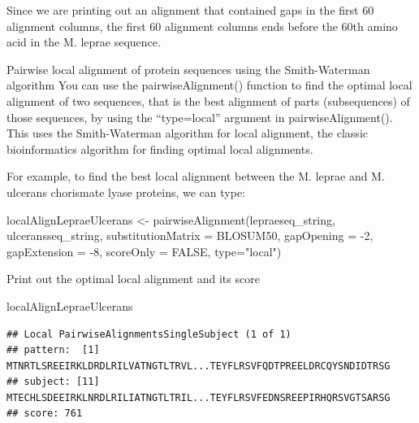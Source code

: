 \documentclass[
]{book}
\newenvironment{Shaded}{\begin{snugshade}}{\end{snugshade}}
\newcommand{\AttributeTok}[1]{\textcolor[rgb]{0.77,0.63,0.00}{#1}}
\newcommand{\ConstantTok}[1]{\textcolor[rgb]{0.00,0.00,0.00}{#1}}
\newcommand{\DecValTok}[1]{\textcolor[rgb]{0.00,0.00,0.81}{#1}}
\newcommand{\FunctionTok}[1]{\textcolor[rgb]{0.00,0.00,0.00}{#1}}
\newcommand{\NormalTok}[1]{#1}
\newcommand{\OtherTok}[1]{\textcolor[rgb]{0.56,0.35,0.01}{#1}}
\newcommand{\SpecialCharTok}[1]{\textcolor[rgb]{0.00,0.00,0.00}{#1}}
\newcommand{\StringTok}[1]{\textcolor[rgb]{0.31,0.60,0.02}{#1}}
\begin{document}
Since we are printing out an alignment that contained gaps in the first 60 alignment columns, the first 60 alignment columns ends before the 60th amino acid in the M. leprae sequence.

Pairwise local alignment of protein sequences using the Smith-Waterman algorithm
You can use the pairwiseAlignment() function to find the optimal local alignment of two sequences, that is the best alignment of parts (subsequences) of those sequences, by using the ``type=local'' argument in pairwiseAlignment(). This uses the Smith-Waterman algorithm for local alignment, the classic bioinformatics algorithm for finding optimal local alignments.

For example, to find the best local alignment between the M. leprae and M. ulcerans chorismate lyase proteins, we can type:

\begin{Shaded}
\begin{Highlighting}[]
\NormalTok{localAlignLepraeUlcerans }\OtherTok{\textless{}{-}} \FunctionTok{pairwiseAlignment}\NormalTok{(lepraeseq\_string, }
\NormalTok{                                              ulceransseq\_string,}
                                              \AttributeTok{substitutionMatrix =}\NormalTok{ BLOSUM50, }
                                              \AttributeTok{gapOpening =} \SpecialCharTok{{-}}\DecValTok{2}\NormalTok{, }
                                              \AttributeTok{gapExtension =} \SpecialCharTok{{-}}\DecValTok{8}\NormalTok{, }
                                              \AttributeTok{scoreOnly =} \ConstantTok{FALSE}\NormalTok{, }
                                              \AttributeTok{type=}\StringTok{"local"}\NormalTok{)}
\end{Highlighting}
\end{Shaded}

Print out the optimal local alignment and its score

\begin{Shaded}
\begin{Highlighting}[]
\NormalTok{localAlignLepraeUlcerans }
\end{Highlighting}
\end{Shaded}

\begin{verbatim}
## Local PairwiseAlignmentsSingleSubject (1 of 1)
## pattern:  [1] MTNRTLSREEIRKLDRDLRILVATNGTLTRVL...TEYFLRSVFQDTPREELDRCQYSNDIDTRSG
## subject: [11] MTECHLSDEEIRKLNRDLRILIATNGTLTRIL...TEYFLRSVFEDNSREEPIRHQRSVGTSARSG
## score: 761
\end{verbatim}
\end{document}
